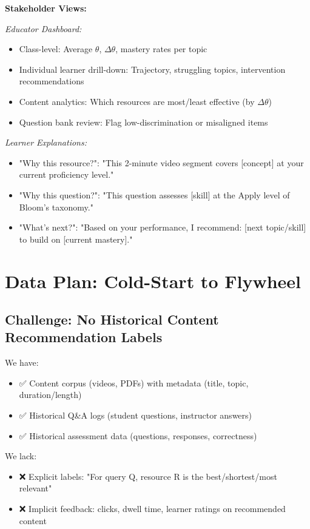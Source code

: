 \documentclass[11pt,letterpaper]{article}
\begin{document}
\textbf{Stakeholder Views:}

\textit{Educator Dashboard:}
\begin{itemize}
\item Class-level: Average $\theta$, $\Delta\theta$, mastery rates per topic
\item Individual learner drill-down: Trajectory, struggling topics, intervention recommendations
\item Content analytics: Which resources are most/least effective (by $\Delta\theta$)
\item Question bank review: Flag low-discrimination or misaligned items
\end{itemize}

\textit{Learner Explanations:}
\begin{itemize}
\item "Why this resource?": "This 2-minute video segment covers [concept] at your current proficiency level."
\item "Why this question?": "This question assesses [skill] at the Apply level of Bloom's taxonomy."
\item "What's next?": "Based on your performance, I recommend: [next topic/skill] to build on [current mastery]."
\end{itemize}

\newpage

\section{Data Plan: Cold-Start to Flywheel}

\subsection{Challenge: No Historical Content Recommendation Labels}

We have:
\begin{itemize}
\item ✅ Content corpus (videos, PDFs) with metadata (title, topic, duration/length)
\item ✅ Historical Q\&A logs (student questions, instructor answers)
\item ✅ Historical assessment data (questions, responses, correctness)
\end{itemize}

We lack:
\begin{itemize}
\item ❌ Explicit labels: "For query Q, resource R is the best/shortest/most relevant"
\item ❌ Implicit feedback: clicks, dwell time, learner ratings on recommended content
\end{itemize}
\end{document}
